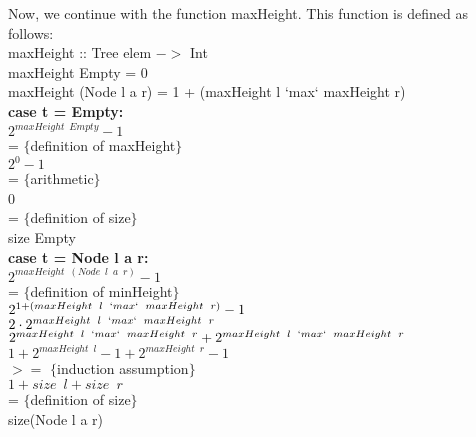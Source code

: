 \documentclass{article}
\begin{document}
\begin{enumerate}
  Now, we continue with the function maxHeight. This function is defined as follows:\\
  maxHeight :: Tree elem $->$ Int \\
  maxHeight Empty = 0 \\
  maxHeight (Node l a r) = 1 + (maxHeight l `max` maxHeight r) \\
  \newline
  \textbf{case t = Empty:} \\
  $2^{maxHeight \enspace Empty} - 1$ \\
  = $\{$definition of maxHeight$\}$ \\
  $2^0 - 1$ \\
  = $\{$arithmetic$\}$ \\
  0 \\
  = $\{$definition of size$\}$ \\
  size Empty \\
  \newline
  \textbf{case t = Node l a r:} \\
  $2^{maxHeight \enspace (Node \enspace l \enspace a \enspace r)} - 1$ \\
  = $\{$definition of minHeight$\}$ \\
  $2^{1 + (maxHeight \enspace l \enspace `max` \enspace maxHeight \enspace r)} - 1$ \\
  $2 \cdot 2^{maxHeight \enspace l \enspace `max` \enspace maxHeight \enspace r}$ \\
  $2^{maxHeight \enspace l \enspace `max` \enspace maxHeight \enspace r} + 2^{maxHeight \enspace l \enspace `max` \enspace maxHeight \enspace r}$ \\
  $1 + 2^{maxHeight \enspace l} - 1 + 2^{maxHeight \enspace r} - 1$ \\
  $>=$ $\{$induction assumption$\}$ \\
  $1 + size \enspace l + size \enspace r$ \\
  = $\{$definition of size$\}$ \\
  size(Node l a r)
\end{enumerate}
\end{document}
